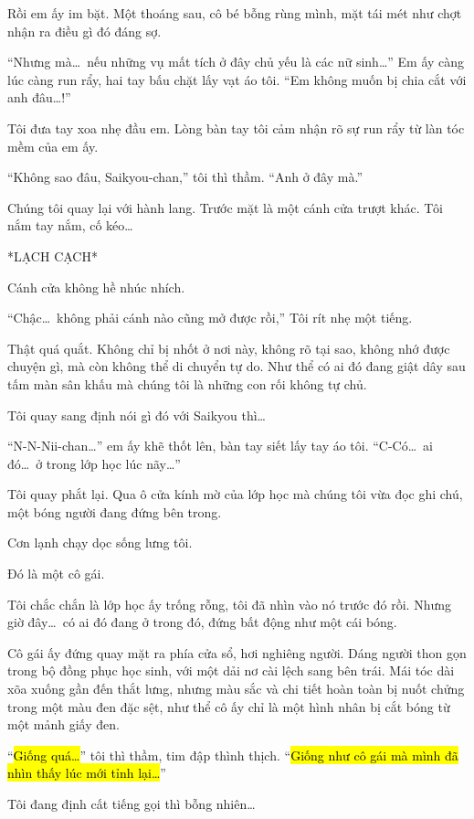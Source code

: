 \documentclass[../main.tex]{subfiles}
\begin{document}
Rồi em ấy im bặt. Một thoáng sau, cô bé bỗng rùng mình, mặt tái mét như chợt nhận ra điều gì đó đáng sợ.

``Nhưng mà\dots\ nếu những vụ mất tích ở đây chủ yếu là các nữ sinh\dots'' Em ấy càng lúc càng run rẩy, hai tay bấu chặt lấy vạt áo tôi. ``Em không muốn bị chia cắt với anh đâu\dots!''

Tôi đưa tay xoa nhẹ đầu em. Lòng bàn tay tôi cảm nhận rõ sự run rẩy từ làn tóc mềm của em ấy.

``Không sao đâu, Saikyou-chan,'' tôi thì thầm. ``Anh ở đây mà.''

Chúng tôi quay lại với hành lang. Trước mặt là một cánh cửa trượt khác. Tôi nắm tay nắm, cố kéo\dots

*LẠCH CẠCH*

Cánh cửa không hề nhúc nhích.

``Chậc\dots\ không phải cánh nào cũng mở được rồi,'' Tôi rít nhẹ một tiếng.

Thật quá quắt. Không chỉ bị nhốt ở nơi này, không rõ tại sao, không nhớ được chuyện gì, mà còn không thể di chuyển tự do. Như thể có ai đó đang giật dây sau tấm màn sân khấu mà chúng tôi là những con rối không tự chủ.

Tôi quay sang định nói gì đó với Saikyou thì\dots

``N-N-Nii-chan\dots'' em ấy khẽ thốt lên, bàn tay siết lấy tay áo tôi. ``C-Có\dots\ ai đó\dots\ ở trong lớp học lúc nãy\dots''

Tôi quay phắt lại. Qua ô cửa kính mờ của lớp học mà chúng tôi vừa đọc ghi chú, một bóng người đang đứng bên trong.

Cơn lạnh chạy dọc sống lưng tôi.

Đó là một cô gái.

Tôi chắc chắn là lớp học ấy trống rỗng, tôi đã nhìn vào nó trước đó rồi. Nhưng giờ đây\dots\ có ai đó đang ở trong đó, đứng bất động như một cái bóng.


Cô gái ấy đứng quay mặt ra phía cửa sổ, hơi nghiêng người. Dáng người thon gọn trong bộ đồng phục học sinh, với một dải nơ cài lệch sang bên trái. Mái tóc dài xõa xuống gần đến thắt lưng, nhưng màu sắc và chi tiết hoàn toàn bị nuốt chửng trong một màu đen đặc sệt, như thể cô ấy chỉ là một hình nhân bị cắt bóng từ một mảnh giấy đen.

``\hl{Giống quá\dots}'' tôi thì thầm, tim đập thình thịch. ``\hl{Giống như cô gái mà mình đã nhìn thấy lúc mới tỉnh lại\dots}''

Tôi đang định cất tiếng gọi thì bỗng nhiên\dots
\end{document}
